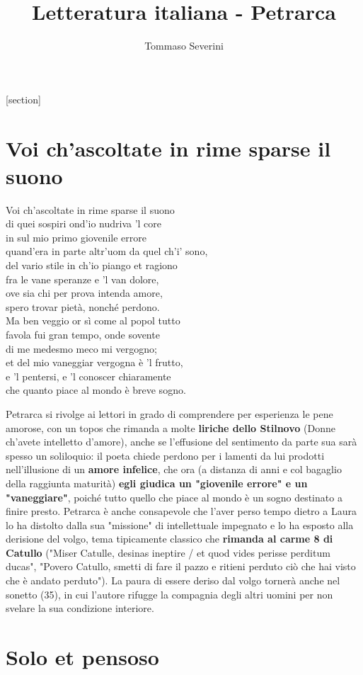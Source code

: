 \documentclass[10pt,a4paper]{article}
\author{Tommaso Severini}
\title{Letteratura italiana - Petrarca}
\begin{document}
	\maketitle
	
	[section]
	
	\section[Domanda 1]{Voi ch'ascoltate in rime sparse il suono}
	
	\begin{estratto}
		Voi ch’ascoltate in rime sparse il suono\\
		di quei sospiri ond’io nudriva ’l core\\
		in sul mio primo giovenile errore\\
		quand’era in parte altr’uom da quel ch’i’ sono,\\
		
		del vario stile in ch’io piango et ragiono\\
		fra le vane speranze e ’l van dolore,\\
		ove sia chi per prova intenda amore,\\
		spero trovar pietà, nonché perdono.\\
		
		Ma ben veggio or sì come al popol tutto\\
		favola fui gran tempo, onde sovente\\
		di me medesmo meco mi vergogno;\\
		
		et del mio vaneggiar vergogna è ’l frutto,\\
		e ’l pentersi, e ’l conoscer chiaramente\\
		che quanto piace al mondo è breve sogno.\\
	\end{estratto}

Petrarca si rivolge ai lettori in grado di comprendere per esperienza le pene amorose, con un topos che rimanda a molte \textbf{liriche dello Stilnovo} (Donne ch'avete intelletto d'amore), anche se l'effusione del sentimento da parte sua sarà spesso un soliloquio: il poeta chiede perdono per i lamenti da lui prodotti nell'illusione di un \textbf{amore infelice}, che ora (a distanza di anni e col bagaglio della raggiunta maturità) \textbf{egli giudica un "giovenile errore" e un "vaneggiare"}, poiché tutto quello che piace al mondo è un sogno destinato a finire presto. Petrarca è anche consapevole che l'aver perso tempo dietro a Laura lo ha distolto dalla sua "missione" di intellettuale impegnato e lo ha esposto alla derisione del volgo, tema tipicamente classico che \textbf{rimanda al carme 8 di Catullo} ("Miser Catulle, desinas ineptire / et quod vides perisse perditum ducas", "Povero Catullo, smetti di fare il pazzo e ritieni perduto ciò che hai visto che è andato perduto"). La paura di essere deriso dal volgo tornerà anche nel sonetto  (35), in cui l'autore rifugge la compagnia degli altri uomini per non svelare la sua condizione interiore.

\section{Solo et pensoso}
\label{sec:Solo et pensoso}
\end{document}
